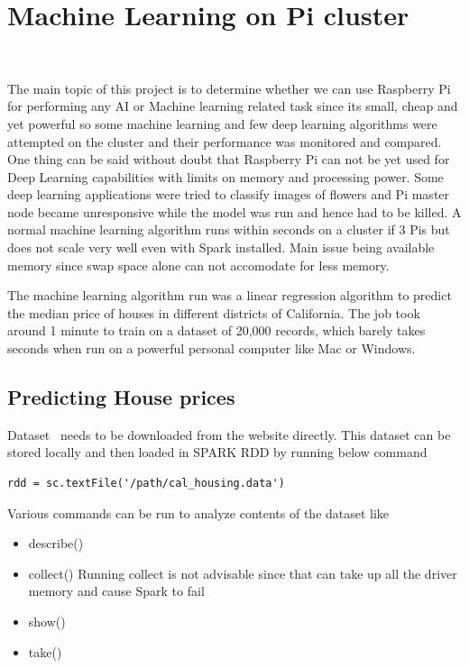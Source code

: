 \section{Machine Learning on Pi cluster}\

The main topic of this project is to determine whether we can use
Raspberry Pi for performing any AI or Machine learning related task
since its small, cheap and yet powerful so some machine learning and
few deep learning algorithms were attempted on the cluster and their
performance was monitored and compared. One thing can be said without
doubt that Raspberry Pi can not be yet used for Deep Learning
capabilities with limits on memory and processing power. Some deep
learning applications were tried to classify images of flowers and Pi
master node became unresponsive while the model was run and hence had
to be killed. A normal machine learning algorithm runs within seconds
on a cluster if 3 Pis but does not scale very well even with Spark
installed. Main issue being available memory since swap space alone
can not accomodate for less memory.

The machine learning algorithm run was a linear regression algorithm
to predict the median price of houses in different districts of
California. The job took around 1 minute to train on a dataset of
20,000 records, which barely takes seconds when run on a powerful
personal computer like Mac or Windows.

\subsection{Predicting House prices }   

Dataset~\cite{hid-sp18-510-dataset} needs to be downloaded from the
website directly. This dataset can be stored locally and then loaded
in SPARK RDD by running below command

\begin{verbatim}
rdd = sc.textFile('/path/cal_housing.data')
\end{verbatim} 

Various commands can be run to analyze contents of the dataset like 
\begin{itemize}
\item describe()
\item collect() Running collect is not advisable since that can take
  up all the driver memory and cause Spark to fail
\item show()
\item take()
\end{itemize}

